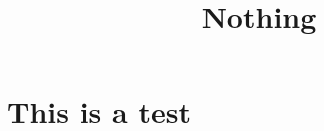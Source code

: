 \documentclass{mathnotes}
\title{Nothing}
\begin{document}
\maketitle
\section{This is a test}
\end{document}
